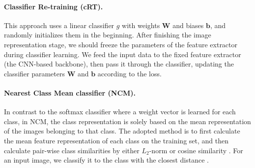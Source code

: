 \documentclass{article}
\begin{document}
\paragraph{Classifier Re-training (cRT).}This approach uses a linear classifier $g$ with weights $\mathbf{W}$ and biases $\mathbf{b}$, and randomly initializes them in the beginning. After finishing the image representation stage, we should freeze the parameters of the feature extractor during classifier learning. We feed the input data to the fixed feature extractor (the CNN-based backbone), then pass it through the classifier, updating the classifier parameters $\mathbf{W}$ and $\mathbf{b}$ according to the loss.

\paragraph{Nearest Class Mean classifier (NCM).}In contrast to the softmax classifier where a weight vector is learned for each class, in NCM, the class representation is solely based on the mean representation of the images belonging to that class. The adopted method is to first calculate the mean feature representation of each class on the training set, and then calculate pair-wise class similarities by either $L_2$-norm or cosine similarity \cite{guerriero2018deepncm}. For an input image, we classify it to the class with the closest distance \cite{rebuffi2017icarl,snell2017prototypical}.
\end{document}
